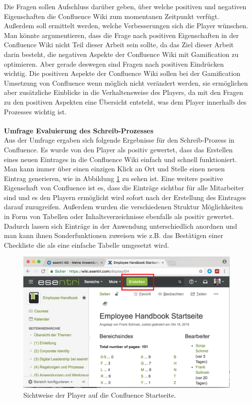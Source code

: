 \documentclass[a4paper,12pt,twoside]{scrartcl}
\begin{document}
Die Fragen sollen Aufschluss darüber geben, über welche positiven und negativen Eigenschaften die Confluence Wiki zum momentanen Zeitpunkt verfügt. Außerdem soll ermittelt werden, welche Verbesserungen sich die Player wünschen. Man könnte argumentieren, dass die Frage nach positiven Eigenschaften in der Confluence Wiki nicht Teil dieser Arbeit sein sollte, da das Ziel dieser Arbeit darin besteht, die negativen Aspekte der Confluence Wiki mit Gamification zu optimieren. Aber gerade deswegen sind Fragen nach positiven Eindrücken wichtig. Die positiven Aspekte der Confluence Wiki sollen bei der Gamification Umsetzung von Confluence wenn möglich nicht verändert werden, sie ermöglichen aber zusätzliche Einblicke in die Verhaltensweise des Players, da mit den Fragen zu den positiven Aspekten eine Übersicht entsteht, was dem Player innerhalb des Prozesses wichtig ist.
\\\\
\textbf{Umfrage Evaluierung des Schreib-Prozesses}\\
Aus der Umfrage ergaben sich folgende Ergebnisse für den Schreib-Prozess in Confluence. Es wurde von den Player als positiv gewertet, dass das Erstellen eines neuen Eintrages in die Confluence Wiki einfach und schnell funktioniert. Man kann immer über einen einzigen Klick an Ort und Stelle einen neuen Eintrag generieren, wie in Abbildung \ref{ConfluenceEintragErstellen} zu sehen ist. Eine weitere positive Eigenschaft von Confluence ist es, dass die Einträge sichtbar für alle Mitarbeiter sind und es den Playern ermöglicht wird sofort nach der Erstellung des Eintrages darauf zuzugreifen. Außerdem wurden die verschiedenen Struktur Möglichkeiten in Form von Tabellen oder Inhaltsverzeichnisse ebenfalls als positiv gewertet. Dadurch lassen sich Einträge in der Anwendung unterschiedlich anordnen und man kann ihnen Sonderfunktionen zuweisen wie z.B. das Bestätigen einer Checkliste die als eine einfache Tabelle umgesetzt wird.
\begin{figure}[h!]
\begin{center}
\includegraphics[scale = 0.4]{Bilder/ConfluenceStart.eps}
\caption{Sichtweise der Player auf die Confluence Startseite.}
\label{ConfluenceEintragErstellen}
\end{center}
\end{figure} 
\end{document}
